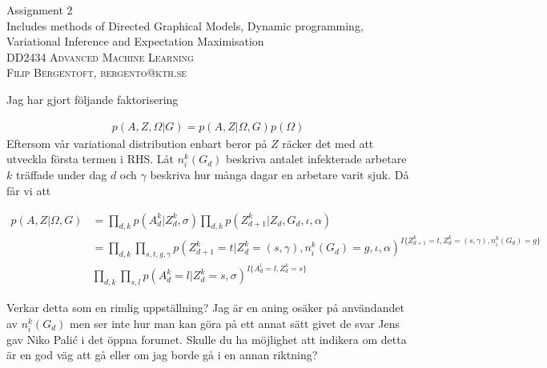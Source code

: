 \documentclass[11pt,oneside,a4paper]{article}
\date{}
\theoremstyle{definition}
\theoremstyle{remark}
\begin{document}
\renewcommand{\bibname}{References}
\hypersetup{citecolor=black}
\begin{titlepage}\centering
\vspace*{\fill}
\Huge Assignment 2\\
\vspace*{10mm}
\large Includes methods of Directed Graphical Models, Dynamic programming, Variational Inference and Expectation Maximisation \\
\vspace*{\fill}
\large \textsc{DD2434 Advanced Machine Learning} \\
\textsc{Filip Bergentoft, bergento@kth.se} \\
\end{titlepage}

\newpage

Jag har gjort följande faktorisering

\begin{align*}
  p(A,Z,\Omega|G) = p(A,Z|\Omega, G)p(\Omega)
\end{align*}
Eftersom vår variational distribution enbart beror på $Z$ räcker det med att utveckla första termen i RHS. Låt $n^k_i(G_d)$ beskriva antalet infekterade arbetare $k$ träffade under dag $d$ och $\gamma$ beskriva hur många dagar en arbetare varit sjuk. Då får vi att

\begin{align*}
  p(A,Z|\Omega, G) & = \prod_{d,k}p(A_d^k|Z_d^k, \sigma) \prod_{d,k} p(Z_{d+1}^k|Z_d, G_d, \iota, \alpha) \\
  & = \prod_{d,k} \prod_{s,t,g,\gamma} p(Z_{d+1}^k = t | Z_d^k = (s,\gamma), n^k_i(G_d) = g, \iota, \alpha)^{I\big\{Z_{d+1}^k = t, Z_d^k = (s,\gamma), n^k_i(G_d) = g \big\}} \\
  & \prod_{d,k} \prod_{s,l} p(A_d^k = l| Z_d^k = s, \sigma)^{I\big\{A_d^l = l, Z_d^k = s \big\}}
\end{align*}

Verkar detta som en rimlig uppställning? Jag är en aning osäker på användandet av $n^k_i(G_d)$ men ser inte hur man kan göra på ett annat sätt givet de svar Jens gav Niko Palić i det öppna forumet. Skulle du ha möjlighet att indikera om detta är en god väg att gå eller om jag borde gå i en annan riktning?
\end{document}
